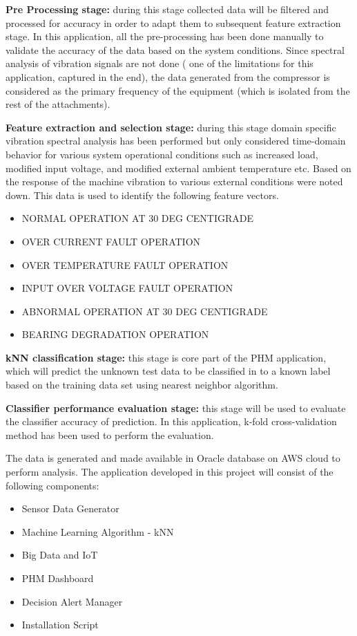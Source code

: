 \documentclass[sigconf]{acmart}
\begin{document}
\textbf{Pre Processing stage:} during this stage collected data will be filtered and processed for accuracy in order to adapt them to subsequent feature extraction stage. In this application, all the pre-processing has been done manually to validate the accuracy of the data based on the system conditions. Since spectral analysis of vibration signals are not done ( one of the limitations for this application, captured in the end), the data generated from the compressor is considered as the primary frequency of the equipment (which is isolated from the rest of the attachments).

\textbf{Feature extraction and selection stage:} during this stage domain specific vibration spectral analysis has been performed but only considered time-domain behavior for various system operational conditions such as increased load, modified input voltage, and modified external ambient temperature etc. Based on the response of the machine vibration to various external conditions were noted down. This data is used to identify the following feature vectors.
\begin{itemize}
\item NORMAL OPERATION AT 30 DEG CENTIGRADE
\item OVER CURRENT FAULT OPERATION
\item OVER TEMPERATURE FAULT OPERATION
\item INPUT OVER VOLTAGE FAULT OPERATION
\item ABNORMAL OPERATION AT 30 DEG CENTIGRADE
\item BEARING DEGRADATION OPERATION
\end{itemize}

\textbf{kNN classification stage:} this stage is core part of the PHM application, which will predict the unknown test data to be classified in to a known label based on the training data set using nearest neighbor algorithm.

\textbf{Classifier performance evaluation stage:} this stage will be used to evaluate the classifier accuracy of prediction. In this application, k-fold cross-validation method has been used to perform the evaluation.

The data is generated and made available in Oracle database on AWS cloud to perform analysis. The application developed in this project will consist of the following components:
\begin{itemize}
  \item Sensor Data Generator
  \item Machine Learning Algorithm - kNN
  \item Big Data and IoT
  \item PHM Dashboard
  \item Decision Alert Manager
  \item Installation Script
 \end{itemize}
\end{document}
